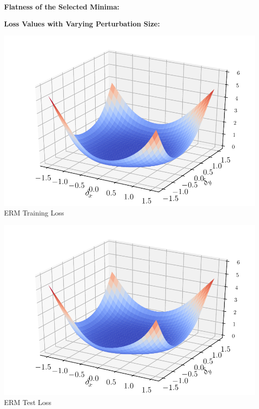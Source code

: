 \documentclass[landscape,a0paper,fontscale=0.3]{baposter}
\begin{document}
\begin{poster}
{\begin{minipage}{0.49\linewidth}
\vspace{0.5em}
\textbf{\color{blue}Flatness of the Selected Minima:}
\vspace{0.5em}
\end{minipage}
\begin{minipage}{0.5\linewidth}
\vspace{0.5em}
\textbf{\color{blue}Loss Values with Varying Perturbation Size:}
\vspace{0.5em}
\end{minipage}

\begin{minipage}{0.49\linewidth}
\begin{minipage}{0.5\linewidth}
\centering
\includegraphics[width=.99\linewidth]{figs/svhn_erm_train_loss_landscape3D.pdf}
\vspace{0.5em}
ERM Training Loss
\vspace{1em}
\end{minipage}
\begin{minipage}{0.49\linewidth}
\centering
\includegraphics[width=.99\linewidth]{figs/svhn_erm_test_loss_landscape3D.pdf}
\vspace{0.5em}
ERM Test Loss
\vspace{1em}
\end{minipage}


\end{minipage}}
\end{poster}
\end{document}
